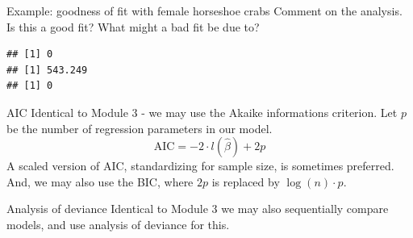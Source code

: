 \documentclass[
  ignorenonframetext,
]{beamer}
\newenvironment{Shaded}{\begin{snugshade}}{\end{snugshade}}
\newcommand{\AttributeTok}[1]{\textcolor[rgb]{0.13,0.29,0.53}{#1}}
\newcommand{\CommentTok}[1]{\textcolor[rgb]{0.56,0.35,0.01}{\textit{#1}}}
\newcommand{\DecValTok}[1]{\textcolor[rgb]{0.00,0.00,0.81}{#1}}
\newcommand{\FunctionTok}[1]{\textcolor[rgb]{0.13,0.29,0.53}{\textbf{#1}}}
\newcommand{\NormalTok}[1]{#1}
\newcommand{\OtherTok}[1]{\textcolor[rgb]{0.56,0.35,0.01}{#1}}
\newcommand{\SpecialCharTok}[1]{\textcolor[rgb]{0.81,0.36,0.00}{\textbf{#1}}}
\newcommand{\StringTok}[1]{\textcolor[rgb]{0.31,0.60,0.02}{#1}}
\begin{document}
\begin{frame}[fragile]
\begin{block}{Example: goodness of fit with female horseshoe crabs}
\protect\hypertarget{example-goodness-of-fit-with-female-horseshoe-crabs}{}
Comment on the analysis. Is this a good fit? What might a bad fit be due
to?

\begin{Shaded}
\end{Shaded}

\begin{verbatim}
## [1] 0
## [1] 543.249
## [1] 0
\end{verbatim}
\end{block}
\end{frame}

\begin{frame}
\begin{block}{AIC}
\protect\hypertarget{aic}{}
Identical to Module 3 - we may use the Akaike informations criterion.
Let \(p\) be the number of regression parameters in our model.
\[\text{AIC} =-2 \cdot l(\hat{\beta})+2p\] A scaled version of AIC,
standardizing for sample size, is sometimes preferred. And, we may also
use the BIC, where \(2p\) is replaced by \(\log(n)\cdot p\).
\end{block}
\end{frame}

\begin{frame}
\begin{block}{Analysis of deviance}
\protect\hypertarget{analysis-of-deviance}{}
Identical to Module 3 we may also sequentially compare models, and use
analysis of deviance for this.
\end{block}
\end{frame}
\end{document}
